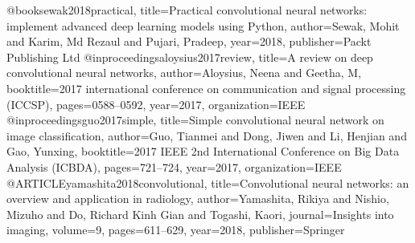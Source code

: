 @book{sewak2018practical,
title={Practical convolutional neural networks: implement advanced deep learning models using Python},
author={Sewak, Mohit and Karim, Md Rezaul and Pujari, Pradeep},
year={2018},
publisher={Packt Publishing Ltd}
}
@inproceedings{aloysius2017review,
title={A review on deep convolutional neural networks},
author={Aloysius, Neena and Geetha, M},
booktitle={2017 international conference on communication and signal
processing (ICCSP)},
pages={0588--0592},
year={2017},
organization={IEEE}
}
@inproceedings{guo2017simple,
title={Simple convolutional neural network on image classification},
author={Guo, Tianmei and Dong, Jiwen and Li, Henjian and Gao, Yunxing},
booktitle={2017 IEEE 2nd International Conference on Big Data Analysis
(ICBDA)},
pages={721--724},
year={2017},
organization={IEEE}
}
@ARTICLE{yamashita2018convolutional,
title={Convolutional neural networks: an overview and application in
radiology},
author={Yamashita, Rikiya and Nishio, Mizuho and Do, Richard Kinh Gian and
Togashi, Kaori},
journal={Insights into imaging},
volume={9},
pages={611--629},
year={2018},
publisher={Springer}
}

